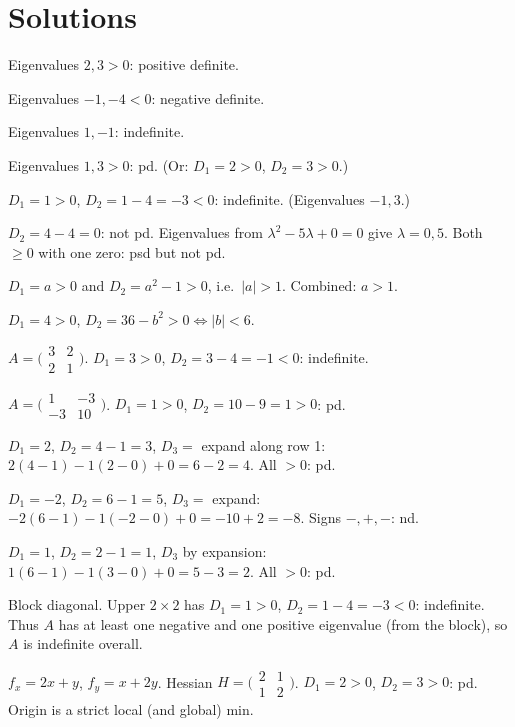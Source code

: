 \section{Solutions}

\begin{solutions}
    \item Eigenvalues $2, 3 > 0$: positive definite.
    \item Eigenvalues $-1, -4 < 0$: negative definite.
    \item Eigenvalues $1, -1$: indefinite.
    \item Eigenvalues $1, 3 > 0$: pd. (Or: $D_{1} = 2 > 0$, $D_{2} = 3 > 0$.)
    \item $D_{1} = 1 > 0$, $D_{2} = 1 - 4 = -3 < 0$: indefinite. (Eigenvalues $-1, 3$.)
    \item $D_{2} = 4 - 4 = 0$: not pd. Eigenvalues from $\lambda^{2} - 5 \lambda + 0 = 0$ give $\lambda = 0, 5$. Both $\ge 0$ with one zero: psd but not pd.
    \item $D_{1} = a > 0$ and $D_{2} = a^{2} - 1 > 0$, i.e.\ $|a| > 1$. Combined: $a > 1$.
    \item $D_{1} = 4 > 0$, $D_{2} = 36 - b^{2} > 0 \Leftrightarrow |b| < 6$.
    \item $A = \bigl(\begin{smallmatrix} 3 & 2 \\ 2 & 1 \end{smallmatrix}\bigr)$. $D_{1} = 3 > 0$, $D_{2} = 3 - 4 = -1 < 0$: indefinite.
    \item $A = \bigl(\begin{smallmatrix} 1 & -3 \\ -3 & 10 \end{smallmatrix}\bigr)$. $D_{1} = 1 > 0$, $D_{2} = 10 - 9 = 1 > 0$: pd.
    \item $D_{1} = 2$, $D_{2} = 4 - 1 = 3$, $D_{3} = $ expand along row 1: $2(4 - 1) - 1(2 - 0) + 0 = 6 - 2 = 4$. All $> 0$: pd.
    \item $D_{1} = -2$, $D_{2} = 6 - 1 = 5$, $D_{3} = $ expand: $-2(6 - 1) - 1(-2 - 0) + 0 = -10 + 2 = -8$. Signs $-, +, -$: nd.
    \item $D_{1} = 1$, $D_{2} = 2 - 1 = 1$, $D_{3}$ by expansion: $1(6 - 1) - 1(3 - 0) + 0 = 5 - 3 = 2$. All $> 0$: pd.
    \item Block diagonal. Upper $2 \times 2$ has $D_{1} = 1 > 0$, $D_{2} = 1 - 4 = -3 < 0$: indefinite. Thus $A$ has at least one negative and one positive eigenvalue (from the block), so $A$ is indefinite overall.
    \item $f_{x} = 2 x + y$, $f_{y} = x + 2 y$. Hessian $H = \bigl(\begin{smallmatrix} 2 & 1 \\ 1 & 2 \end{smallmatrix}\bigr)$. $D_{1} = 2 > 0$, $D_{2} = 3 > 0$: pd. Origin is a strict local (and global) min.

\end{solutions}
